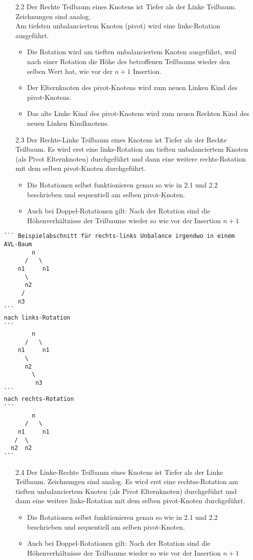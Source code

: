 \begin{itemize}
	\item[2.2] Der Rechte Teilbaum eines Knotens ist Tiefer als der Linke Teilbaum. Zeichnungen sind analog.\\
Am tiefsten unbalanciertem Knoten (pivot) wird eine links-Rotation ausgeführt. 
	\begin{itemize}
		\item Die Rotation wird am tieften unbalanciertem Knoten ausgeführt, weil nach einer Rotation die Höhe des betroffenen Teilbaums wieder den selben Wert hat, wie vor der $n+1$ Insertion.
		\item Der Elternknoten des pivot-Knotens wird zum neuen Linken Kind des pivot-Knotens.
		\item Das alte Linke Kind des pivot-Knotens wird zum neuen Rechten Kind des neuen Linken Kindknotens.
	\end{itemize}
	\item[2.3] Der Rechte-Linke Teilbaum eines Knotens ist Tiefer als der Rechte Teilbaum.
Es wird erst eine links-Rotation am tieften unbalanciertem Knoten (als Pivot Elternknoten) durchgeführt und dann eine weitere rechts-Rotation
mit dem selben pivot-Knoten durchgeführt. 
	\begin{itemize}
		\item Die Rotationen selbst funktionieren genau so wie in 2.1 und 2.2 beschrieben und sequentiell am selben pivot-Knoten.
		\item Auch bei Doppel-Rotationen gilt: Nach der Rotation sind die Höhenverhältnisse der Teilbaume wieder so wie vor der Insertion $n+1$
	\end{itemize}
\end{itemize}

\begin{verbatim}
``` Beispielabschnitt für rechts-links Unbalance irgendwo in einem AVL-Baum
        n
      /   \
    n1     n1
      \
      n2
     /
    n3
```
nach links-Rotation
```
        n
      /   \
    n1     n1
      \
      n2
        \
         n3
```
nach rechts-Rotation
```
        n
      /   \
    n1     n1
   /  \
  n2  n2
```
\end{verbatim}

\begin{itemize}
	\item[2.4] Der Linke-Rechte Teilbaum eines Knotens ist Tiefer als der Linke Teilbaum. Zeichnungen sind analog. Es wird erst eine rechtss-Rotation am tieften unbalanciertem Knoten (als Pivot Elternknoten) durchgeführt und dann eine weitere links-Rotation mit dem selben pivot-Knoten durchgeführt.
	
	\begin{itemize}
		\item Die Rotationen selbst funktionieren genau so wie in 2.1 und 2.2 beschrieben und sequentiell am selben pivot-Knoten.
		\item Auch bei Doppel-Rotationen gilt: Nach der Rotation sind die Höhenverhältnisse der Teilbaume wieder so wie vor der Insertion $n+1$
	\end{itemize}
\end{itemize}


